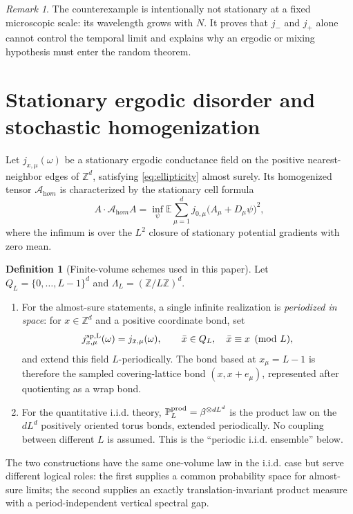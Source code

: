 \documentclass[11pt]{article}
\theoremstyle{definition}
\newtheorem{definition}[theorem]{Definition}
\theoremstyle{remark}
\newtheorem{remark}[theorem]{Remark}
\newcommand{\Z}{\mathbb Z}
\newcommand{\E}{\mathbb E}
\newcommand{\Prob}{\mathbb P}
\newcommand{\cA}{\mathcal A}
\begin{document}
\begin{remark}
The counterexample is intentionally not stationary at a fixed microscopic scale: its wavelength grows with $N$.  It proves that $j_-$ and $j_+$ alone cannot control the temporal limit and explains why an ergodic or mixing hypothesis must enter the random theorem.
\end{remark}

\section{Stationary ergodic disorder and stochastic homogenization}
\label{sec:homogenization}

Let $j_{x,\mu}(\omega)$ be a stationary ergodic conductance field on the positive nearest-neighbor edges of $\Z^d$, satisfying \eqref{eq:ellipticity} almost surely.  Its homogenized tensor $\cA_{\mathrm hom}$ is characterized by the stationary cell formula
\begin{equation}
 A\cdot\cA_{\mathrm hom}A
 =\inf_{\psi}
 \E\sum_{\mu=1}^d
 j_{0,\mu}\bigl(A_\mu+D_\mu\psi\bigr)^2,
 \label{eq:hom-cell}
\end{equation}
where the infimum is over the $L^2$ closure of stationary potential gradients with zero mean.

\begin{definition}[Finite-volume schemes used in this paper]
\label{def:periodization}
Let $Q_L=\{0,\ldots,L-1\}^d$ and $\Lambda_L=(\Z/L\Z)^d$.
\begin{enumerate}[label=\textup{(\roman*)},leftmargin=2.5em]
 \item For the almost-sure statements, a single infinite realization is \emph{periodized in space}: for $x\in\Z^d$ and a positive coordinate bond, set
 \[
  j^{\rm sp,L}_{x,\mu}(\omega)=j_{\bar x,\mu}(\omega),
  \qquad \bar x\in Q_L,\quad \bar x\equiv x\pmod L,
 \]
 and extend this field $L$-periodically.  The bond based at $x_\mu=L-1$ is therefore the sampled covering-lattice bond $(x,x+e_\mu)$, represented after quotienting as a wrap bond.
 \item For the quantitative i.i.d. theory, $\Prob_L^{\rm prod}=\beta^{\otimes dL^d}$ is the product law on the $dL^d$ positively oriented torus bonds, extended periodically.  No coupling between different $L$ is assumed.  This is the ``periodic i.i.d. ensemble'' below.
\end{enumerate}
The two constructions have the same one-volume law in the i.i.d. case but serve different logical roles: the first supplies a common probability space for almost-sure limits; the second supplies an exactly translation-invariant product measure with a period-independent vertical spectral gap.
\end{definition}
\end{document}

